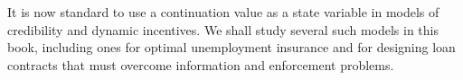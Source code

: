   It is now standard to
use a continuation value  as a state variable
in models of credibility and dynamic incentives.     We shall
study several such models in this book, including ones for
optimal unemployment insurance and for designing loan contracts
that must overcome information and enforcement problems.

